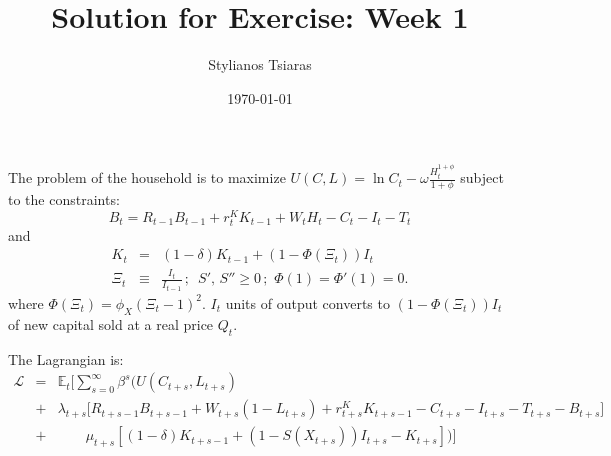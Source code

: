 \documentclass[thmsa,11pt,a4paper]{article}
\theoremstyle{definition}
\begin{document}
\title{\textbf{Solution for Exercise: Week 1}}

\author[1]{Stylianos Tsiaras}

\date{\today}              %

\renewcommand{\thefootnote}{\fnsymbol{footnote}}

\singlespacing

\maketitle

\thispagestyle{empty}


\onehalfspacing
\setcounter{footnote}{0}
\renewcommand{\thefootnote}{\arabic{footnote}}
\setcounter{page}{1}

The problem of the household is to maximize $U(C,L) = \ln C_t - \omega\frac{H_t^{1+\phi}}{1+\phi}$ subject to the constraints:
\begin{equation}\label{HBC1}
  B_{t}= R_{t-1} B_{t-1}+r_{t}^K K_{t-1}+W_{t} H_t-C_t-I_t-T_t
\end{equation} and
\begin{eqnarray}  \nonumber 
K_{t}&=&(1-\delta) K_{t-1}+(1-\Phi(\Xi_t))I_t\,\\ \nonumber 
\Xi_t&\equiv&\frac{I_t}{I_{t-1}}\,; \,\,\, S',\, S'' \ge
0\,;\,\,\Phi(1)=\Phi'(1)=0. \label{Kaccum1}
 \end{eqnarray}
where $\Phi(\Xi_t)=\phi_X (\Xi_t-1)^2$.
 $I_t$ units of output converts to $(1-\Phi(\Xi_t))I_t$ of new capital sold at a real price $Q_t$.



 The Lagrangian is:
\begin{eqnarray*}\label{Lag}
\mathcal{L}&=&\mathbb{E}_t \Big[\sum_{s=0}^\infty \beta^s \Big( U(C_{t+s}, L_{t+s}) \\&+&\lambda_{t+s} \Big[R_{t+s-1} B_{t+s-1}+W_{t+s} (1-L_{t+s}) +r_{t+s}^K K_{t+s-1}-C_{t+s}-I_{t+s}- T_{t+s}-B_{t+s}] \\&+&  \quad \quad \mu_{t+s}[ (1-\delta)K_{t+s-1}+(1-S(X_{t+s}))I_{t+s}-K_{t+s} ]\Big) \Big]
\end{eqnarray*}
\end{document}
